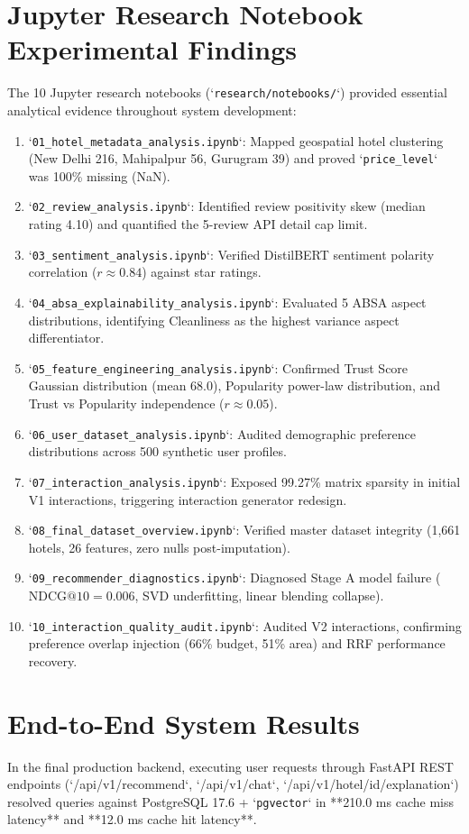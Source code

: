 \section{Jupyter Research Notebook Experimental Findings}
The 10 Jupyter research notebooks (`\texttt{research/notebooks/}`) provided essential analytical evidence throughout system development:
\begin{enumerate}
    \item `\texttt{01\_hotel\_metadata\_analysis.ipynb}`: Mapped geospatial hotel clustering (New Delhi 216, Mahipalpur 56, Gurugram 39) and proved `\texttt{price\_level}` was 100\% missing (NaN).
    \item `\texttt{02\_review\_analysis.ipynb}`: Identified review positivity skew (median rating 4.10) and quantified the 5-review API detail cap limit.
    \item `\texttt{03\_sentiment\_analysis.ipynb}`: Verified DistilBERT sentiment polarity correlation ($r \approx 0.84$) against star ratings.
    \item `\texttt{04\_absa\_explainability\_analysis.ipynb}`: Evaluated 5 ABSA aspect distributions, identifying Cleanliness as the highest variance aspect differentiator.
    \item `\texttt{05\_feature\_engineering\_analysis.ipynb}`: Confirmed Trust Score Gaussian distribution (mean 68.0), Popularity power-law distribution, and Trust vs Popularity independence ($r \approx 0.05$).
    \item `\texttt{06\_user\_dataset\_analysis.ipynb}`: Audited demographic preference distributions across 500 synthetic user profiles.
    \item `\texttt{07\_interaction\_analysis.ipynb}`: Exposed 99.27\% matrix sparsity in initial V1 interactions, triggering interaction generator redesign.
    \item `\texttt{08\_final\_dataset\_overview.ipynb}`: Verified master dataset integrity (1,661 hotels, 26 features, zero nulls post-imputation).
    \item `\texttt{09\_recommender\_diagnostics.ipynb}`: Diagnosed Stage A model failure ($\text{NDCG}@10 = 0.006$, SVD underfitting, linear blending collapse).
    \item `\texttt{10\_interaction\_quality\_audit.ipynb}`: Audited V2 interactions, confirming preference overlap injection (66\% budget, 51\% area) and RRF performance recovery.
\end{enumerate}

\section{End-to-End System Results}
In the final production backend, executing user requests through FastAPI REST endpoints (`/api/v1/recommend`, `/api/v1/chat`, `/api/v1/hotel/{id}/explanation`) resolved queries against PostgreSQL 17.6 + `\texttt{pgvector}` in **210.0 ms cache miss latency** and **12.0 ms cache hit latency**.

